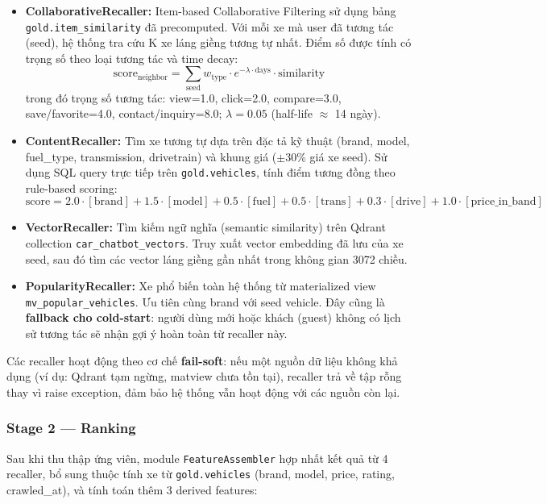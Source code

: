\begin{itemize}
    \item \textbf{CollaborativeRecaller:} Item-based Collaborative Filtering sử dụng bảng \texttt{gold.item\_similarity} đã precomputed. Với mỗi xe mà user đã tương tác (seed), hệ thống tra cứu K xe láng giềng tương tự nhất. Điểm số được tính có trọng số theo loại tương tác và time decay:
    \[
    \text{score}_{\text{neighbor}} = \sum_{\text{seed}} w_{\text{type}} \cdot e^{-\lambda \cdot \text{days}} \cdot \text{similarity}
    \]
    trong đó trọng số tương tác: view=1.0, click=2.0, compare=3.0, save/favorite=4.0, contact/inquiry=8.0; $\lambda = 0.05$ (half-life $\approx$ 14 ngày).

    \item \textbf{ContentRecaller:} Tìm xe tương tự dựa trên đặc tả kỹ thuật (brand, model, fuel\_type, transmission, drivetrain) và khung giá ($\pm$30\% giá xe seed). Sử dụng SQL query trực tiếp trên \texttt{gold.vehicles}, tính điểm tương đồng theo rule-based scoring:
    \[
    \text{score} = 2.0 \cdot [\text{brand}] + 1.5 \cdot [\text{model}] + 0.5 \cdot [\text{fuel}] + 0.5 \cdot [\text{trans}] + 0.3 \cdot [\text{drive}] + 1.0 \cdot [\text{price\_in\_band}]
    \]

    \item \textbf{VectorRecaller:} Tìm kiếm ngữ nghĩa (semantic similarity) trên Qdrant collection \texttt{car\_chatbot\_vectors}. Truy xuất vector embedding đã lưu của xe seed, sau đó tìm các vector láng giềng gần nhất trong không gian 3072 chiều.

    \item \textbf{PopularityRecaller:} Xe phổ biến toàn hệ thống từ materialized view \texttt{mv\_popular\_vehicles}. Ưu tiên cùng brand với seed vehicle. Đây cũng là \textbf{fallback cho cold-start}: người dùng mới hoặc khách (guest) không có lịch sử tương tác sẽ nhận gợi ý hoàn toàn từ recaller này.
\end{itemize}

Các recaller hoạt động theo cơ chế \textbf{fail-soft}: nếu một nguồn dữ liệu không khả dụng (ví dụ: Qdrant tạm ngừng, matview chưa tồn tại), recaller trả về tập rỗng thay vì raise exception, đảm bảo hệ thống vẫn hoạt động với các nguồn còn lại.

\subsubsection{Stage 2 — Ranking}

Sau khi thu thập ứng viên, module \texttt{FeatureAssembler} hợp nhất kết quả từ 4 recaller, bổ sung thuộc tính xe từ \texttt{gold.vehicles} (brand, model, price, rating, crawled\_at), và tính toán thêm 3 derived features:

